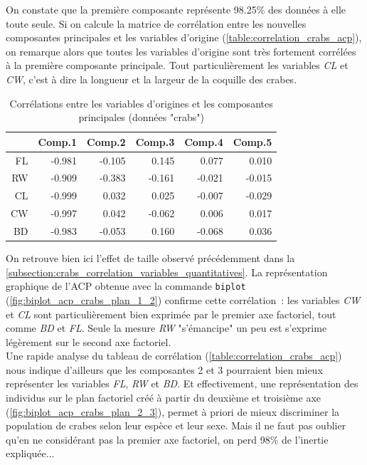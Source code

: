 \documentclass[a4paper,11pt]{report}
\begin{document}
On constate que la première composante représente 98.25\% des données à elle toute seule. Si on calcule la matrice de corrélation entre les nouvelles composantes principales et les variables d'origine (\autoref{table:correlation_crabs_acp}), on remarque alors que toutes les variables d'origine sont très fortement corrélées à la première composante principale.
Tout particulièrement les variables \textit{CL} et \textit{CW}, c'est à dire la longueur et la largeur de la coquille des crabes.

\begin{table}[H]
	\centering
	\captionsetup{justification=centering, margin=2cm}
	\caption{Corrélations entre les variables d'origines et les composantes principales (données "crabs")}
	\label{table:correlation_crabs_acp}
	\begin{tabular}{r|rrrrr}
		& Comp.1 & Comp.2 & Comp.3 & Comp.4 & Comp.5 \\ 
		\hline
		FL & -0.981 & -0.105 & 0.145 & 0.077 & 0.010 \\ 
		RW & -0.909 & -0.383 & -0.161 & -0.021 & -0.015 \\ 
		CL & -0.999 & 0.032 & 0.025 & -0.007 & -0.029 \\ 
		CW & -0.997 & 0.042 & -0.062 & 0.006 & 0.017 \\ 
		BD & -0.983 & -0.053 & 0.160 & -0.068 & 0.036 \\ 
	\end{tabular}
\end{table}

On retrouve bien ici l'effet de taille observé précédemment dans la  \autoref{subsection:crabs_correlation_variables_quantitatives}. La représentation graphique de l'ACP obtenue avec la commande \texttt{biplot} (\autoref{fig:biplot_acp_crabs_plan_1_2}) confirme cette corrélation~: les variables \textit{CW} et \textit{CL} sont particulièrement bien exprimée par le premier axe factoriel, tout comme \textit{BD} et \textit{FL}. Seule la mesure \textit{RW} "s'émancipe" un peu est s'exprime légèrement sur le second axe factoriel.\\
Une rapide analyse du tableau de corrélation (\autoref{table:correlation_crabs_acp}) nous indique d'ailleurs que les composantes 2 et 3 pourraient bien mieux représenter les variables \textit{FL}, \textit{RW} et \textit{BD}. Et effectivement, une représentation des individus sur le plan factoriel créé à partir du deuxième et troisième axe (\autoref{fig:biplot_acp_crabs_plan_2_3}), permet à priori de mieux discriminer la population de crabes selon leur espèce et leur sexe. Mais il ne faut pas oublier qu'en ne considérant pas la premier axe factoriel, on perd 98\% de l'inertie expliquée...
\end{document}
